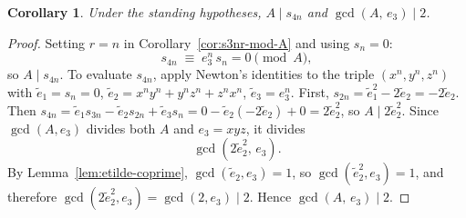 \documentclass[12pt]{article}
\newtheorem{corollary}[theorem]{Corollary}
\theoremstyle{definition}
\begin{document}
	\begin{corollary}
		\label{cor:gcd-A-e3}
		Under the standing hypotheses, $A \mid s_{4n}$ and $\gcd(A,\, e_3) \mid 2$.
	\end{corollary}
	\begin{proof}
		Setting $r = n$ in Corollary~\ref{cor:s3nr-mod-A} and using $s_n = 0$:
		\[
		s_{4n} \;\equiv\; e_3^n\,s_n = 0 \pmod{A},
		\]
		so $A \mid s_{4n}$.  To evaluate $s_{4n}$, apply Newton's identities to the triple $(x^n,y^n,z^n)$
		with $\tilde{e}_1 = s_n = 0$, $\tilde{e}_2 = x^ny^n+y^nz^n+z^nx^n$, $\tilde{e}_3 = e_3^n$.
		First, $s_{2n} = \tilde{e}_1^2 - 2\tilde{e}_2 = -2\tilde{e}_2$.
		Then $s_{4n} = \tilde{e}_1 s_{3n} - \tilde{e}_2 s_{2n} + \tilde{e}_3 s_n
		= 0 - \tilde{e}_2(-2\tilde{e}_2) + 0 = 2\tilde{e}_2^2$, so
		$A \mid 2\tilde{e}_2^2$.  Since $\gcd(A, e_3)$ divides both
		$A$ and $e_3 = xyz$, it divides
		\[
		\gcd(2\tilde{e}_2^2,\, e_3).
		\]
		By Lemma~\ref{lem:etilde-coprime}, $\gcd(\tilde{e}_2, e_3) = 1$,
		so $\gcd(\tilde{e}_2^2, e_3) = 1$, and therefore
		$\gcd(2\tilde{e}_2^2, e_3) = \gcd(2, e_3) \mid 2$.
		Hence $\gcd(A,\, e_3) \mid 2$.
	\end{proof}
	
\end{document}
